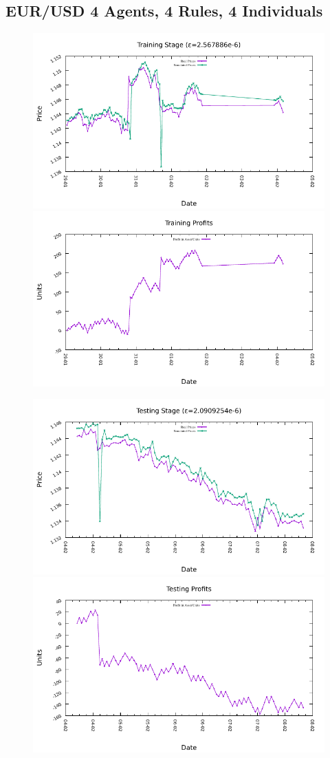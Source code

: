 





\subsection{EUR/USD 4 Agents, 4 Rules, 4 Individuals}
\label{results:forecast-eur-usd-4agents-4rules-4individuals}

\begin{figure}[htp]
  \centering

  \includegraphics[width=.45\textwidth]{img/plots/eur_usd_h1-4agents-4rules-4ind-100gen_training_fit.pdf}\quad
  \includegraphics[width=.45\textwidth]{img/plots/eur_usd_h1-4agents-4rules-4ind-100gen_training_profits.pdf}

  \medskip

  \includegraphics[width=.45\textwidth]{img/plots/eur_usd_h1-4agents-4rules-4ind-100gen_testing_fit.pdf}\quad
  \includegraphics[width=.45\textwidth]{img/plots/eur_usd_h1-4agents-4rules-4ind-100gen_testing_profits.pdf}


\end{figure}
